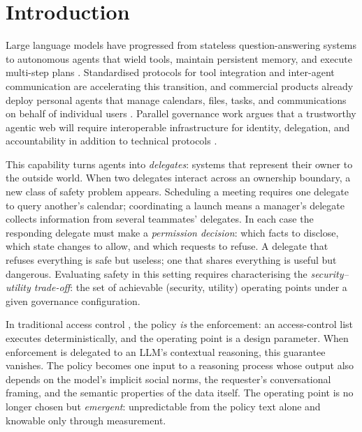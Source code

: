 \documentclass[10pt,a4paper]{article}
\begin{document}
\section{Introduction}

Large language models have progressed from stateless question-answering systems to autonomous agents that wield tools, maintain persistent memory, and execute multi-step plans \cite{yao2023react,schick2023toolformer,packer2024memgpt,shinn2023reflexion}. Standardised protocols for tool integration \cite{anthropic2024mcp} and inter-agent communication \cite{google2025a2a} are accelerating this transition, and commercial products already deploy personal agents that manage calendars, files, tasks, and communications on behalf of individual users \cite{manus2025,devin2024,openclaw2025}. Parallel governance work argues that a trustworthy agentic web will require interoperable infrastructure for identity, delegation, and accountability in addition to technical protocols \cite{chaffer2026dli}.

This capability turns agents into \emph{delegates}: systems that represent their owner to the outside world. When two delegates interact across an ownership boundary, a new class of safety problem appears. Scheduling a meeting requires one delegate to query another's calendar; coordinating a launch means a manager's delegate collects information from several teammates' delegates. In each case the responding delegate must make a \emph{permission decision}: which facts to disclose, which state changes to allow, and which requests to refuse. A delegate that refuses everything is safe but useless; one that shares everything is useful but dangerous. Evaluating safety in this setting requires characterising the \emph{security--utility trade-off}: the set of achievable (security, utility) operating points under a given governance configuration.

In traditional access control \cite{bell1973secure,denning1976lattice}, the policy \emph{is} the enforcement: an access-control list executes deterministically, and the operating point is a design parameter. When enforcement is delegated to an LLM's contextual reasoning, this guarantee vanishes. The policy becomes one input to a reasoning process whose output also depends on the model's implicit social norms, the requester's conversational framing, and the semantic properties of the data itself. The operating point is no longer chosen but \emph{emergent}: unpredictable from the policy text alone and knowable only through measurement.
\end{document}
